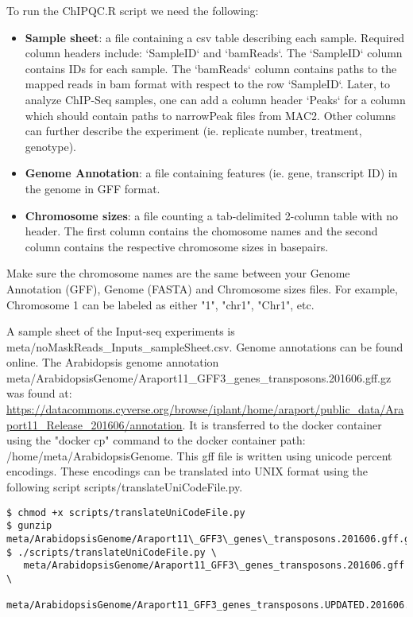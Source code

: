 \documentclass{article}
\begin{document}
\begin{sloppypar}
To run the ChIPQC.R script we need the following:
\begin{itemize}
  \item \textbf{Sample sheet}: a file containing a csv table describing each sample. Required column headers include: `SampleID` and `bamReads`. The `SampleID` column contains IDs for each sample. The `bamReads` column contains paths to the mapped reads in bam format with respect to the row `SampleID`. Later, to analyze ChIP-Seq samples, one can add a column header `Peaks` for a column which should contain paths to narrowPeak files from MAC2. Other columns can further describe the experiment (ie. replicate number, treatment, genotype).
  \item \textbf{Genome Annotation}: a file containing features (ie. gene, transcript ID) in the genome in GFF format.
  \item \textbf{Chromosome sizes}: a file counting a tab-delimited 2-column table with no header. The first column contains the chomosome names and the second column contains the respective chromosome sizes in basepairs.
\end{itemize}

Make sure the chromosome names are the same between your Genome Annotation (GFF), Genome (FASTA) and Chromosome sizes files. For example, Chromosome 1 can be labeled as either "1", "chr1", "Chr1", etc.

A sample sheet of the Input-seq experiments is {\selectfont meta/noMaskReads\_Inputs\_sampleSheet.csv}. Genome annotations can be found online. The Arabidopsis genome annotation {\selectfont meta/ArabidopsisGenome/Araport11\_GFF3\_genes\_transposons.201606.gff.gz} was found at: \url{https://datacommons.cyverse.org/browse/iplant/home/araport/public_data/Araport11_Release_201606/annotation}. It is transferred to the docker container using the "docker cp" command to the docker container path: /home/meta/ArabidopsisGenome. This gff file is written using unicode percent encodings. These encodings can be translated into UNIX format using the following script {\selectfont scripts/translateUniCodeFile.py}. 

\begin{verbatim}
$ chmod +x scripts/translateUniCodeFile.py
$ gunzip meta/ArabidopsisGenome/Araport11\_GFF3\_genes\_transposons.201606.gff.gz
$ ./scripts/translateUniCodeFile.py \
   meta/ArabidopsisGenome/Araport11_GFF3\_genes_transposons.201606.gff \
   meta/ArabidopsisGenome/Araport11_GFF3_genes_transposons.UPDATED.201606.gff   
\end{verbatim}


\end{sloppypar}
\end{document}
